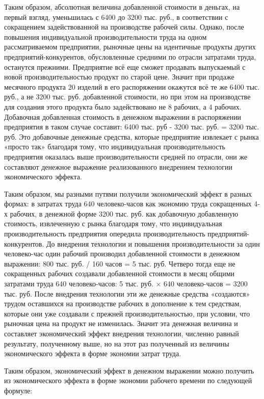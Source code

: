 \documentclass{article}
\begin{document}
Таким образом, абсолютная величина добавленной стоимости в деньгах, на первый взгляд, уменьшилась с 6400 до 3200 тыс. руб., в соответствии с сокращением задействованной на производстве рабочей силы. Однако, после повышения индивидуальной производительности труда на одном рассматриваемом предприятии, рыночные цены на идентичные продукты других предприятий-конкурентов, обусловленные средними по отрасли затратами труда, останутся прежними. Предприятие всё еще сможет продавать выпускаемый с новой производительностью продукт по старой цене. Значит при продаже месячного продукта 20 изделий в его распоряжении окажутся всё те же 6400 тыс. руб., а не 3200 тыс. руб. добавленной стоимости, но при этом на производстве для создания этого продукта было задействовано не 8 рабочих, а 4 рабочих. Добавочная добавленная стоимость в денежном выражении в распоряжении предприятия в таком случае составит: 6400 тыс. руб - 3200 тыс. руб. = 3200 тыс. руб. Это добавочные денежные средства, которые предприятие извлекает с рынка «просто так» благодаря тому, что индивидуальная производительность предприятия оказалась выше производительности средней по отрасли, они же составляют денежное выражение реализованного внедрением технологии экономического эффекта.

Таким образом, мы разными путями получили экономический эффект в разных формах: в затратах труда 640 человеко-часов как экономию труда сокращенных 4-х рабочих, в денежной форме 3200 тыс. руб. как добавочную добавленную стоимость, извлеченную с рынка благодаря тому, что индивидуальная производительность предприятия опередила производительность предприятий-конкурентов. До внедрения технологии и повышения производительности за один человеко-час один рабочий производил добавленной стоимости в денежном выражении: 800 тыс. руб. / 160 часов = 5 тыс. руб. Четверо тогда еще не сокращенных рабочих создавали добавленной стоимости в месяц общими затратами труда 640 человеко-часов: 5 тыс. руб. × 640 человеко-часов = 3200 тыс. руб. После внедрения технологии эти же денежные средства «создаются» трудом оставшихся на производстве рабочих в дополнение к тем средствам, которые они уже создавали с прежней производительностью, при условии, что рыночная цена на продукт не изменилась. Значит эта денежная величина и составляет экономический эффект внедрения технологии, численно равный результату, полученному выше, но на этот раз полученный из величины экономического эффекта в форме экономии затрат труда.

Таким образом, экономический эффект в денежном выражении можно получить из экономического эффекта в форме экономии рабочего времени по следующей формуле:
\end{document}
